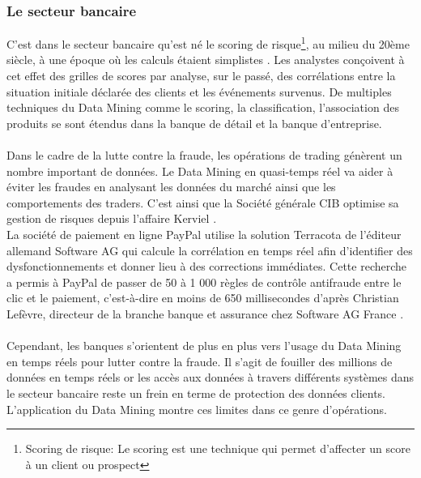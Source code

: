 \documentclass[11pt,a4paper]{report}
\begin{document}
\subsubsection{Le secteur bancaire}
%
%
  C'est dans le secteur bancaire qu'est né le scoring de risque\footnote{Scoring de risque: Le scoring est une technique qui permet d’affecter un score à un client ou prospect}, au milieu du 20ème siècle, à une époque où les calculs étaient simplistes \cite{stephane}. Les analystes  conçoivent à cet effet des grilles de scores par analyse, sur le passé, des corrélations entre la situation initiale déclarée des clients et les événements survenus.
   De multiples techniques du Data Mining comme le scoring, la classification, l'association des produits se sont étendus dans la banque de détail et la banque d'entreprise. \\\\
 Dans le cadre de la lutte contre la fraude, les opérations de trading génèrent un nombre important de données. Le Data Mining en quasi-temps réel va aider à éviter les fraudes en analysant les données du marché ainsi que les comportements des traders. C'est ainsi que la Société générale CIB optimise sa gestion de risques depuis l'affaire Kerviel \cite{banque_fraude}.\\ La société de paiement en ligne PayPal utilise la solution Terracota de l'éditeur allemand Software AG qui calcule la corrélation en temps réel afin d'identifier des dysfonctionnements et donner lieu à des corrections immédiates. Cette recherche a permis à PayPal de passer de 50 à 1 000 règles de contrôle antifraude entre le clic et le paiement, c'est-à-dire en moins de 650 millisecondes d'après Christian Lefèvre, directeur de la branche banque et assurance chez Software AG France \cite{banque_fraude}.\\\\ 
  Cependant, les banques s'orientent de plus en plus vers l'usage du Data Mining en temps réels pour lutter contre la fraude. Il s'agit de fouiller des millions de données en temps réels or les accès aux données à travers différents systèmes dans le secteur bancaire reste un frein en terme de protection des données clients. L'application du Data Mining montre ces limites dans ce genre d'opérations.
 
\end{document}
